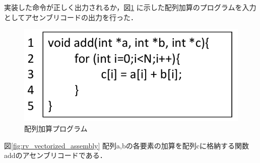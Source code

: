 
実装した命令が正しく出力されるか，図\ref{fig:add_array_c}
に示した配列加算のプログラムを入力としてアセンブリコードの出力を行った．

\begin{figure}
    \centering
    \includegraphics[scale=0.6]{image/add_array_c.pdf}
    \caption{配列加算プログラム}
    \label{fig:add_array_c}
\end{figure}

図\ref{fig:rv_vectorized_assembly}
配列a,bの各要素の加算を配列cに格納する関数addのアセンブリコードである．

